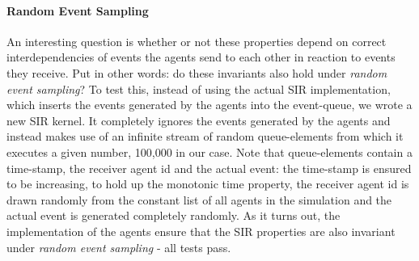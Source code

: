 \paragraph{Random Event Sampling}
An interesting question is whether or not these properties depend on correct interdependencies of events the agents send to each other in reaction to events they receive. Put in other words: do these invariants also hold under \textit{random event sampling}? To test this, instead of using the actual SIR implementation, which inserts the events generated by the agents into the event-queue, we wrote a new SIR kernel. It completely ignores the events generated by the agents and instead makes use of an infinite stream of random queue-elements from which it executes a given number, 100,000 in our case. Note that queue-elements contain a time-stamp, the receiver agent id and the actual event: the time-stamp is ensured to be increasing, to hold up the monotonic time property, the receiver agent id is drawn randomly from the constant list of all agents in the simulation and the actual event is generated completely randomly. As it turns out, the implementation of the agents ensure that the SIR properties are also invariant under \textit{random event sampling} - all tests pass.
